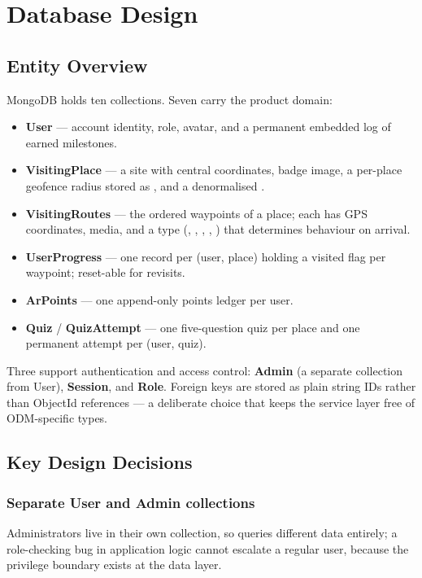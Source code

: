 \chapter{Database Design}
\label{ch:database-schemas}

\section{Entity Overview}
MongoDB holds ten collections. Seven carry the product domain:

\begin{itemize}
  \item \textbf{User} --- account identity, role, avatar, and a permanent
        embedded log of earned milestones.
  \item \textbf{VisitingPlace} --- a site with central coordinates, badge
        image, a per-place geofence radius stored as
        , and a denormalised
        .
  \item \textbf{VisitingRoutes} --- the ordered waypoints of a place; each
        has GPS coordinates, media, and a type
        (, , , ,
        ) that determines behaviour on arrival.
  \item \textbf{UserProgress} --- one record per (user, place) holding a
        visited flag per waypoint; reset-able for revisits.
  \item \textbf{ArPoints} --- one append-only points ledger per user.
  \item \textbf{Quiz} / \textbf{QuizAttempt} --- one five-question quiz per
        place and one permanent attempt per (user, quiz).
\end{itemize}

Three support authentication and access control: \textbf{Admin} (a separate
collection from User), \textbf{Session}, and \textbf{Role}. Foreign keys are
stored as plain string IDs rather than ObjectId references --- a deliberate
choice that keeps the service layer free of ODM-specific types.

\section{Key Design Decisions}

\subsection{Separate User and Admin collections}
Administrators live in their own collection, so
 queries different data entirely; a
role-checking bug in application logic cannot escalate a regular user,
because the privilege boundary exists at the data layer.

